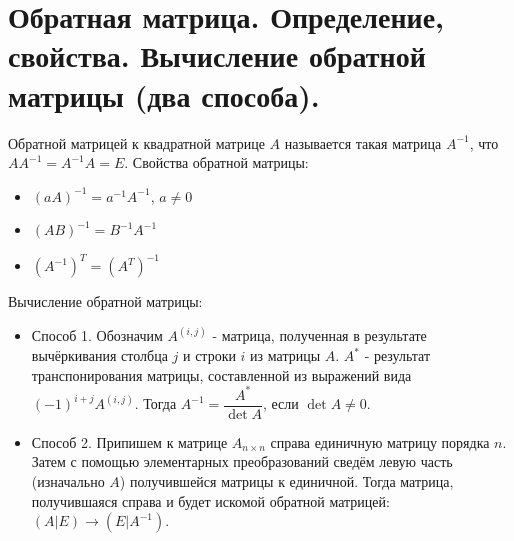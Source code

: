 \documentclass[12pt]{article}
\begin{document}
\begin{sloppypar}
    \section{Обратная матрица. Определение, свойства. Вычисление обратной матрицы (два способа).}
    Обратной матрицей к квадратной матрице $A$ называется такая матрица $A^{-1}$, что $AA^{-1} = A^{-1}A = E$.
    Свойства обратной матрицы:
    \begin{itemize}
        \item $(aA)^{-1} = a^{-1}A^{-1}$, $a \neq 0$
        \item $(AB)^{-1} = B^{-1}A^{-1}$
        \item $(A^{-1})^T = (A^T)^{-1}$
    \end{itemize}
    Вычисление обратной матрицы:
    \begin{itemize}
        \item Способ 1. Обозначим $A^{(i, j)}$ - матрица, полученная в результате вычёркивания столбца $j$ и строки $i$ из матрицы $A$. $A^*$ - результат транспонирования матрицы, составленной из выражений вида $(-1)^{i + j}A^{(i, j)}$. Тогда $A^{-1} = \dfrac{A^*}{\det A}$, если $\det A \neq 0$.
        \item Способ 2. Припишем к матрице $A_{n \times n}$ справа единичную матрицу порядка $n$. Затем с помощью элементарных преобразований сведём левую часть (изначально $A$) получившейся матрицы к единичной. Тогда матрица, получившаяся справа и будет искомой обратной матрицей: $(A|E) \rightarrow (E|A^{-1})$.
    \end{itemize}


\end{sloppypar}
\end{document}
